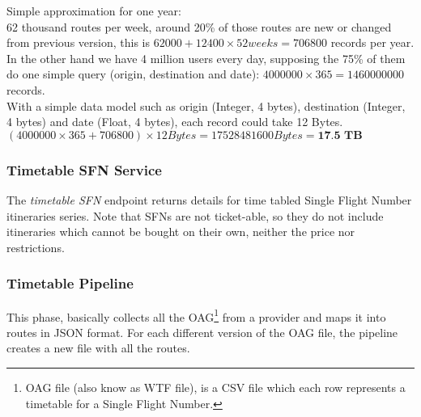 Simple approximation for one year:
\\
62 thousand routes per week, around 20\% of those routes are new or changed from previous version, this is $62000+12400\times52weeks=706800$ records per year.
\\
In the other hand we have 4 million users every day, supposing the 75\% of them do one simple query (origin, destination and date): $4000000\times365=1460000000$ records.
\\
With a simple data model such as origin (Integer, 4 bytes), destination (Integer, 4 bytes) and date (Float, 4 bytes), each record could take 12 Bytes.
\\
$(4000000\times365+706800)\times12 Bytes = 17528481600 Bytes = \textbf{17.5 TB}$


\subsubsection*{Timetable SFN Service} \label{timetable_sfn_service}

The \textit{timetable SFN} endpoint returns details for time tabled Single Flight Number itineraries series. Note that SFNs are not ticket-able, so they do not include itineraries which cannot be bought on their own, neither the price nor restrictions.

\subsubsection*{Timetable Pipeline} \label{timetable_pipeline}

This phase, basically collects all the OAG\footnote{OAG file (also know as WTF file), is a CSV\cite{csv} file which each row represents a timetable for a Single Flight Number.} from a provider and maps it into routes in JSON\cite{json} format. For each different version of the OAG file, the pipeline creates a new file with all the routes.

